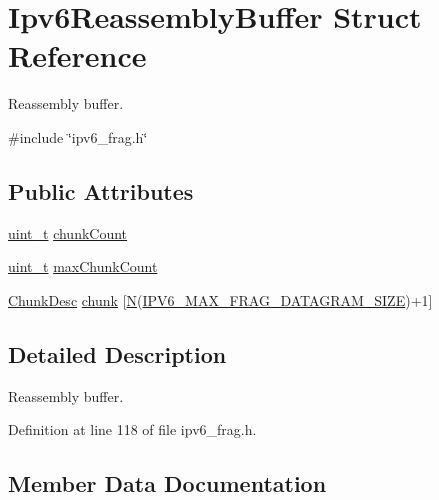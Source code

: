 \hypertarget{structIpv6ReassemblyBuffer}{}\section{Ipv6\+Reassembly\+Buffer Struct Reference}
\label{structIpv6ReassemblyBuffer}


Reassembly buffer.  




{\ttfamily \#include \char`\"{}ipv6\+\_\+frag.\+h\char`\"{}}

\subsection*{Public Attributes}
\begin{DoxyCompactItemize}
\item 
\hyperlink{compiler__port_8h_a12a1e9b3ce141648783a82445d02b58d}{uint\+\_\+t} \hyperlink{structIpv6ReassemblyBuffer_ae4cd44718d4c80b83fe7e0decdb51cc3}{chunk\+Count}
\item 
\hyperlink{compiler__port_8h_a12a1e9b3ce141648783a82445d02b58d}{uint\+\_\+t} \hyperlink{structIpv6ReassemblyBuffer_a78933f1f92c2e1c7d19cae869fa09b45}{max\+Chunk\+Count}
\item 
\hyperlink{structChunkDesc}{Chunk\+Desc} \hyperlink{structIpv6ReassemblyBuffer_a71fc099ccf3935c677607c9fcc5bbbc8}{chunk} \mbox{[}\hyperlink{net__mem_8h_a5d7f6248b8dd365190e7562d4e14a4f3}{N}(\hyperlink{net__config_8h_ac016101236364e74fc7e0729bf2d8d16}{I\+P\+V6\+\_\+\+M\+A\+X\+\_\+\+F\+R\+A\+G\+\_\+\+D\+A\+T\+A\+G\+R\+A\+M\+\_\+\+S\+I\+ZE})+1\mbox{]}
\end{DoxyCompactItemize}


\subsection{Detailed Description}
Reassembly buffer. 

Definition at line 118 of file ipv6\+\_\+frag.\+h.



\subsection{Member Data Documentation}
\mbox{\label{structIpv6ReassemblyBuffer_a71fc099ccf3935c677607c9fcc5bbbc8}} 
